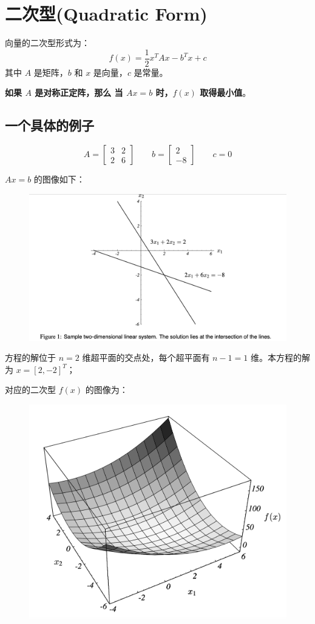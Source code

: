 \documentclass[12pt]{article}
\begin{document}
\section{二次型(Quadratic Form)}
向量的二次型形式为：
$$
f(x) = \frac{1}{2}x^TAx - b^Tx + c
$$
其中 $A$ 是矩阵，$b$ 和 $x$ 是向量，$c$ 是常量。

\textbf{如果 $A$ 是对称正定阵，那么 当 $Ax = b$ 时，$f(x)$ 取得最小值}。

\subsection{一个具体的例子}
$$
A = \begin{bmatrix} 3 & 2 \\ 2 & 6 \end{bmatrix} \qquad 
b = \begin{bmatrix} 2 \\ -8 \end{bmatrix} \qquad 
c = 0
$$

$Ax = b$ 的图像如下：
\begin{figure}[H]
    \centering
    \includegraphics[width=.8\textwidth]{fig/CG_Plot_Eq_1.png}
\end{figure}
方程的解位于 $n=2$ 维超平面的交点处，每个超平面有 $n-1=1$ 维。本方程的解为 $x = [2, -2]^T$；

对应的二次型 $f(x)$ 的图像为：
\begin{figure}[H]
    \centering
    \includegraphics[width=.6\textwidth]{fig/CG_Plot_Eq_2.png}
\end{figure}
\end{document}
